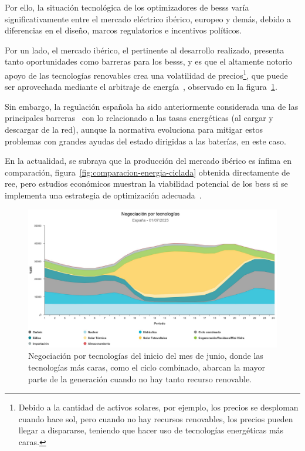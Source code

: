 Por ello, la situación tecnológica de los optimizadores de \glspl{bess} varía significativamente entre el mercado eléctrico ibérico, europeo y demás, debido a diferencias en el diseño, marcos regulatorios e incentivos políticos.

Por un lado, el mercado ibérico, el pertinente al desarrollo realizado, presenta tanto oportunidades como barreras para los \glspl{bess}, y es que el altamente notorio apoyo de las tecnologías renovables crea una volatilidad de precios\footnote{Debido a la cantidad de activos solares, por ejemplo, los precios se desploman cuando hace sol, pero cuando no hay recursos renovables, los precios pueden llegar a dispararse, teniendo que hacer uso de tecnologías energéticas más caras.}, que puede ser aprovechada mediante el arbitraje de energía~\cite{hu2022potential}, observado en la figura~\ref{fig:arbitraje-tecnologia}.

Sin embargo, la regulación española ha sido anteriormente considerada una de las principales barreras~\cite{hu2021barriers} con lo relacionado a las tasas energéticas (al cargar y descargar de la red), aunque la normativa evoluciona para mitigar estos problemas con grandes ayudas del estado dirigidas a las baterías, en este caso.

En la actualidad, se subraya que la producción del mercado ibérico es ínfima en comparación, figura~\ref{fig:comparacion-energia-ciclada} obtenida directamente de \gls{ree}, pero estudios económicos muestran la viabilidad potencial de los \gls{bess} si se implementa una estrategia de optimización adecuada~\cite{he2015optimal}.

\begin{figure}
  \centering
  \includegraphics[width=0.75\linewidth]{figures/arbitraje-tecnologia.jpg}
  \caption[Negociación por tecnologías.]{Negociación por tecnologías del inicio del mes de junio, donde las tecnologías más caras, como el ciclo combinado, abarcan la mayor parte de la generación cuando no hay tanto recurso renovable.}
  \label{fig:arbitraje-tecnologia}
\end{figure}

